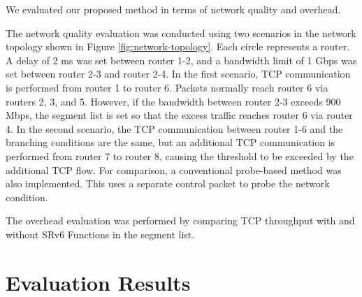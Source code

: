 \documentclass[conference]{IEEEtran}
\begin{document}

We evaluated our proposed method in terms of network quality and overhead.

The network quality evaluation was conducted using two scenarios in the network topology shown in Figure \ref{fig:network-topology}.
Each circle represents a router. A delay of 2 ms was set between router 1-2, and a bandwidth limit of 1 Gbps was set between router 2-3 and router 2-4.
In the first scenario, TCP communication is performed from router 1 to router 6.
Packets normally reach router 6 via routers 2, 3, and 5. However, if the bandwidth between router 2-3 exceeds 900 Mbps, the segment list is set so that the excess traffic reaches router 6 via router 4.
In the second scenario, the TCP communication between router 1-6 and the branching conditions are the same, but an additional TCP communication is performed from router 7 to router 8, causing the threshold to be exceeded by the additional TCP flow.
For comparison, a conventional probe-based method was also implemented. This uses a separate control packet to probe the network condition.

The overhead evaluation was performed by comparing TCP throughput with and without SRv6 Functions in the segment list.

\section{Evaluation Results}

\end{document}
